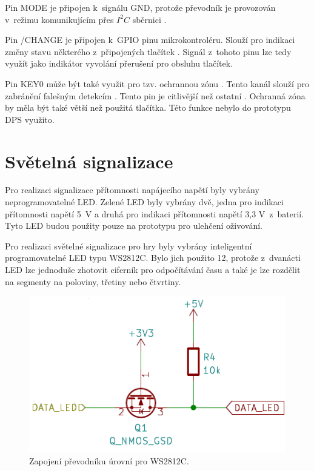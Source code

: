 Pin MODE je připojen k~signálu GND, protože převodník je provozován v~režimu komunikujícím přes $I^2C$ sběrnici \cite{conv_cap_but_AT42QT1070_dtsh}.

Pin /CHANGE je připojen k~GPIO pinu mikrokontroléru. Slouží pro indikaci změny stavu některého z~připojených tlačítek \cite{conv_cap_but_AT42QT1070_dtsh}. 
Signál z~tohoto pinu lze tedy využít jako indikátor vyvolání přerušení pro obsluhu tlačítek. 

Pin KEY0 může být také využit pro tzv. ochrannou zónu \cite{conv_cap_but_AT42QT1070_dtsh}. Tento kanál slouží pro zabránění falešným 
detekcím \cite{conv_cap_but_AT42QT1070_dtsh}. Tento pin je citlivější než ostatní \cite{conv_cap_but_AT42QT1070_dtsh}. Ochranná zóna by měla být také větší 
než použitá tlačítka. Této funkce nebylo do prototypu DPS využito. 

\section{Světelná signalizace}
Pro realizaci signalizace přítomnosti napájecího napětí byly vybrány neprogramovatelné LED. Zelené LED byly vybrány dvě, jedna pro 
indikaci přítomnosti napětí 5~V a druhá pro indikaci přítomnosti napětí 3,3 V~z~baterií. Tyto LED budou použity pouze na prototypu 
pro ulehčení oživování. 

Pro realizaci světelné signalizace pro hry byly vybrány inteligentní programovatelné LED typu WS2812C. Bylo jich použito 12, protože 
z~dvanácti LED lze jednoduše zhotovit ciferník pro odpočítávání času a také je lze rozdělit na segmenty na poloviny, třetiny nebo čtvrtiny. 

\begin{figure}[!h]
  \begin{center}
    \includegraphics[scale=0.6]{obrazky/prevodnik_urovni_pro_WS2812C.png}
  \end{center}
  \caption[Zapojení převodníku úrovní pro WS2812C]{Zapojení převodníku úrovní pro WS2812C.}
\end{figure} 

